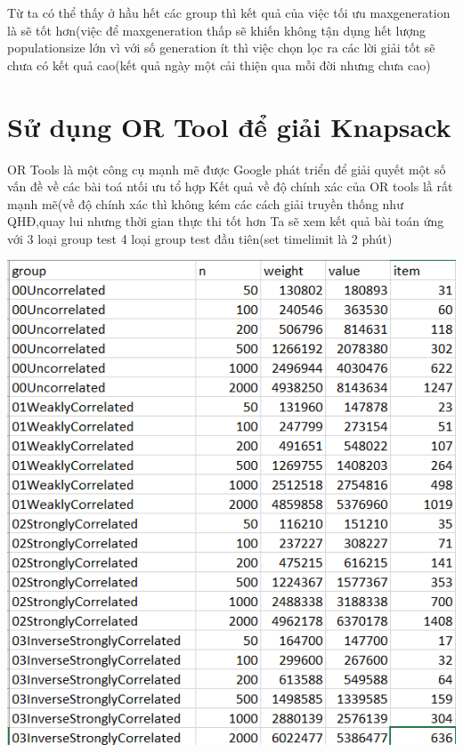 \documentclass{article}
\begin{document}
Từ ta có thể thấy ở hầu hết các group thì kết quả của việc tối ưu maxgeneration là sẽ tốt hơn(việc để maxgeneration thấp sẽ khiến không tận dụng hết lượng populationsize lớn vì với số generation ít thì việc chọn lọc ra các lời giải tốt sẽ chưa có kết quả cao(kết quả ngày một cải thiện qua mỗi đời nhưng chưa cao) 



\section{Sử dụng OR Tool để giải Knapsack}
OR Tools là một công cụ mạnh mẽ được Google phát triển để giải quyết một số vấn đề  về các bài toá ntối ưu tổ hợp
Kết quả về độ chính xác của OR tools lầ rất mạnh mẽ(về độ chính xác thì không kém các cách giải truyền thống như QHĐ,quay lui nhưng thời gian thực thi tốt hơn
Ta sẽ xem kết quả bài toán ứng với 3 loại group test 4 loại group test đầu tiên(set timelimit là 2 phút)

\begin{center}
    \centering
    \includegraphics[width=15cm]{image/report13.png}
\end{center}
\end{document}
